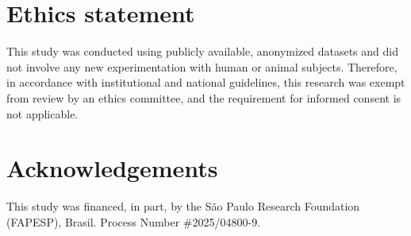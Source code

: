 \documentclass[%
reprint,
nofootinbib,
 amsmath,amssymb,
aps,
superscriptaddress,
showkeys,
longbibliography
]{revtex4-1}
\begin{document}
\section*{Ethics statement}

This study was conducted using publicly available, anonymized datasets and did not involve any new experimentation with human or animal subjects. Therefore, in accordance with institutional and national guidelines, this research was exempt from review by an ethics committee, and the requirement for informed consent is not applicable.

\section*{Acknowledgements}
This study was financed, in part, by the São Paulo Research Foundation (FAPESP), Brasil. Process Number \#2025/04800-9.


\end{document}
